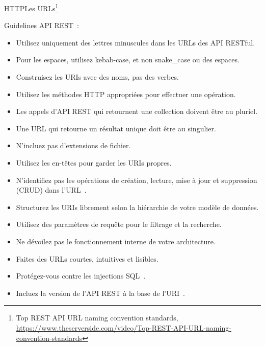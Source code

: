 \documentclass{beamer}
\begin{document}
    \begin{frame}{HTTP}{Les URLs\footnote{Top REST API URL naming convention standards, \url{https://www.theserverside.com/video/Top-REST-API-URL-naming-convention-standards}}}
        \begin{tiny}
            Guidelines API REST~:
            \begin{itemize}
                \item Utilisez uniquement des lettres minuscules dans les URLs des API RESTful.
                \item Pour les espaces, utilisez kebab-case, et non snake\_case ou des espaces.
                \item Construisez les URIs avec des noms, pas des verbes.
                \item Utilisez les méthodes HTTP appropriées pour effectuer une opération.
                \item Les appels d'API REST qui retournent une collection doivent être au pluriel.
                \item Une URL qui retourne un résultat unique doit être au singulier.
                \item N'incluez pas d'extensions de fichier.
                \item Utilisez les en-têtes pour garder les URIs propres.
                \item N'identifiez pas les opérations de création, lecture, mise à jour et suppression (CRUD) dans l'URL~.
                \item Structurez les URIs librement selon la hiérarchie de votre modèle de données.
                \item Utilisez des paramètres de requête pour le filtrage et la recherche.
                \item Ne dévoilez pas le fonctionnement interne de votre architecture.
                \item Faites des URLs courtes, intuitives et lisibles.
                \item Protégez-vous contre les injections SQL~.
                \item Incluez la version de l'API REST à la base de l'URI~.
            \end{itemize}
        \end{tiny}
    \end{frame}
\end{document}
